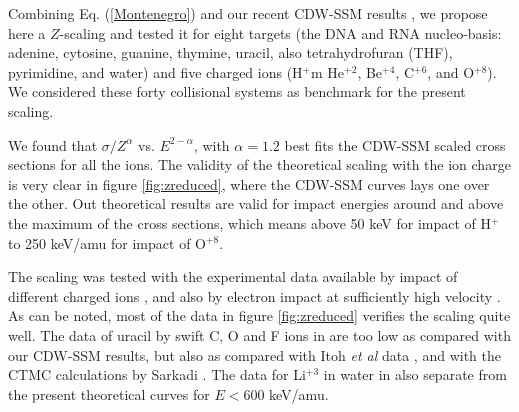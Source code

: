 \documentclass[10pt,showpacs,showkeys,twocolumn]{revtex4}
\begin{document}
 
Combining Eq. (\ref{Montenegro}) and our recent CDW-SSM results \cite{MendezJPB20}, we propose here a $Z$-scaling and tested it %
for eight targets (the DNA and RNA nucleo-basis: adenine, cytosine, guanine, thymine, uracil, also tetrahydrofuran (THF), pyrimidine, and water) and five charged ions (H$^+$m He$^{+2}$, Be$^{+4}$, C$^{+6}$, and O$^{+8}$). We considered these forty collisional systems as benchmark for the present scaling. 

We found that $\sigma/Z^{\alpha}$ vs. $E^{2-\alpha}$, with $\alpha=1.2$ best fits the CDW-SSM scaled cross sections for all the ions. %
The validity of the theoretical scaling with the ion charge is very clear in figure \ref{fig:zreduced}, where the CDW-SSM curves lays one over the other.  Out theoretical results are valid for impact energies around and above the maximum of the cross sections, which means above 50 keV for impact of H$^+$  to 250 keV/amu for impact of O$^{+8}$. 

The scaling was tested with the experimental data available %
by impact of different charged ions \cite{itoh2013,iriki2011,wolff2014,wang2016,tribedi2019,agnihotri2012,agnihotri2013,Luna2007,Rudd86,Rudd85,Luna_Li_water,DalCappello2009,Tribedi_O_water},
and also by electron impact at sufficiently high velocity \cite{rahman2016,bug2017,wolf2019,fuss2009}. As can be noted, most of the data in figure \ref{fig:zreduced} verifies the scaling quite well. The data of uracil by swift C, O and F ions 
in \cite{agnihotri2012,agnihotri2013} are too low as compared with our CDW-SSM results, but also as compared with Itoh \textit{et al} data \cite{itoh2013}, and with the CTMC calculations by Sarkadi \cite{sarkadi2016}.
The data for Li$^{+3}$ in water in \cite{Luna_Li_water} also separate from the present theoretical curves for $E<600$ keV/amu.






\end{document}
